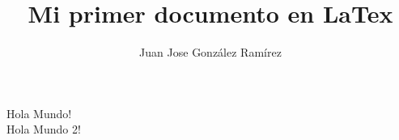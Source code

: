 \documentclass{article}
\title{Mi primer documento en LaTex} %
\author{Juan Jose González Ramírez}
\begin{document}
\maketitle %
Hola Mundo! \\ %
Hola Mundo 2!
\end{document}
